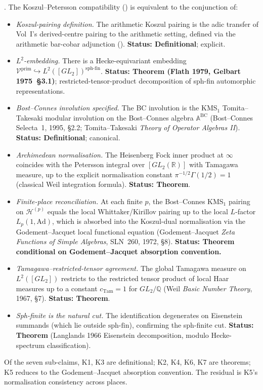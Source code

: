\begin{theorem}
\label{v4-arith:sw:thm:KP-split}
\ClaimStatusProvedHere. The Koszul--Petersson compatibility
() is equivalent to
the conjunction of:
\begin{itemize}
\item[(K1)] \emph{Koszul-pairing definition.} The arithmetic Koszul
pairing is the adic transfer of Vol~I's derived-centre pairing to
the arithmetic setting, defined via the arithmetic bar-cobar
adjunction ().
\textbf{Status: Definitional}; explicit.
\item[(K2)] \emph{\(L^{2}\)-embedding.} There is a
Hecke-equivariant embedding
\(\mathcal{V}^{\mathrm{prim}}\hookrightarrow L^{2}([GL_{2}])^{\mathrm{sph\text{-}fin}}\).
\textbf{Status: Theorem (Flath 1979, Gelbart 1975~\S3.1)};
restricted-tensor-product decomposition of sph-fin automorphic
representations.
\item[(K3)] \emph{Bost--Connes involution specified.} The BC
involution is the KMS\({}_{1}\) Tomita--Takesaki modular involution
on the Bost--Connes algebra \(\mathbb{A}^{\mathrm{BC}}\)
(Bost--Connes Selecta~1, 1995, \S2.2; Tomita--Takesaki
\emph{Theory of Operator Algebras II}).
\textbf{Status: Definitional}; canonical.
\item[(K4)] \emph{Archimedean normalisation.} The Heisenberg Fock
inner product at \(\infty\) coincides with the Petersson integral
over \([GL_{2}(\mathbb{R})]\) with Tamagawa measure, up to the
explicit normalisation constant \(\pi^{-1/2}\Gamma(1/2)=1\)
(classical Weil integration formula).
\textbf{Status: Theorem}.
\item[(K5)] \emph{Finite-place reconciliation.} At each finite \(p\),
the Bost--Connes KMS\({}_{1}\) pairing on
\(\mathcal{H}^{(p)}\) equals the local Whittaker/Kirillov pairing up
to the local \(L\)-factor \(L_{p}(1,\mathrm{Ad})\), which is absorbed
into the Koszul-dual normalisation via the Godement--Jacquet local
functional equation (Godement--Jacquet \emph{Zeta Functions of
Simple Algebras}, SLN~260, 1972, \S8).
\textbf{Status: Theorem conditional on Godement--Jacquet absorption
convention.}
\item[(K6)] \emph{Tamagawa--restricted-tensor agreement.} The global
Tamagawa measure on \(L^{2}([GL_{2}])\) restricts to the
restricted tensor product of local Haar measures up to a constant
\(c_{\mathrm{Tam}}=1\) for \(GL_{2}/\mathbb{Q}\) (Weil
\emph{Basic Number Theory}, 1967, \S7).
\textbf{Status: Theorem}.
\item[(K7)] \emph{Sph-finite is the natural cut.} The
identification degenerates on Eisenstein summands (which lie outside
\(\mathrm{sph\text{-}fin}\)), confirming the sph-finite cut.
\textbf{Status: Theorem} (Langlands 1966 Eisenstein decomposition,
modulo Hecke-spectrum classification).
\end{itemize}
Of the seven sub-claims, K1, K3 are definitional; K2, K4, K6, K7
are theorems; K5 reduces to the Godement--Jacquet absorption
convention. The residual is K5's normalisation consistency across
places.
\end{theorem}

